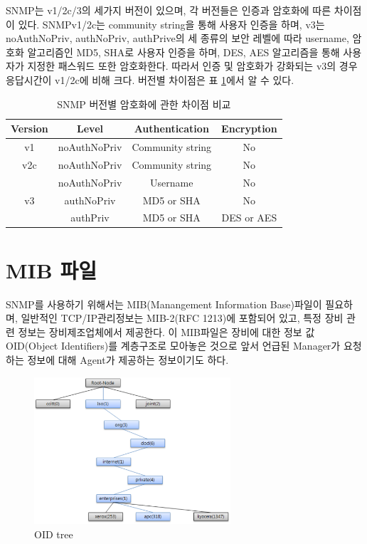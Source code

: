 \documentclass[11pt
  , a4paper
  , article
  , oneside
]{memoir}
\begin{document}
\hfil\break
\hfil\break
\hfil\break
\hfil\break

SNMP는 v1/2c/3의 세가지 버전이 있으며, 각 버전들은 인증과 암호화에 따른 차이점이 있다. SNMPv1/2c는 community string을 통해 사용자 인증을 하며, v3는 noAuthNoPriv, authNoPriv, authPrive의 세 종류의 보안 레벨에 따라 username, 암호화 알고리즘인 MD5, SHA로 사용자 인증을 하며, DES, AES 알고리즘을 통해 사용자가 지정한 패스워드 또한 암호화한다. 따라서 인증 및 암호화가 강화되는 v3의 경우 응답시간이 v1/2c에 비해 크다. 버전별 차이점은 표 \ref{table:conparision}\citep{comparison}에서 알 수 있다.

\begin{table}[h!]
\begin{center}
\begin{tabular}{c|c|c|c}\hline
Version & Level & Authentication & Encryption \\ \hline
v1 & noAuthNoPriv & Community string & No \\ \hline
v2c & noAuthNoPriv & Community string & No \\ \hline
 & noAuthNoPriv & Username & No \\ \cline{2-4}
v3 & authNoPriv & MD5 or SHA & No \\ \cline{2-4}
 & authPriv & MD5 or SHA & DES or AES \\ \hline
\end{tabular}
\caption{SNMP 버전별 암호화에 관한 차이점 비교}
  \label{table:conparision}  
\end{center}
\end{table} 

\section{MIB 파일}
SNMP를 사용하기 위해서는 MIB(Manangement Information Base)파일이 필요하며, 일반적인 TCP/IP관리정보는 MIB-2(RFC 1213)에 포함되어 있고, 특정 장비 관련 정보는 장비제조업체에서 제공한다. 이 MIB파일은 장비에 대한 정보 값 OID(Object Identifiers)를 계층구조로 모아놓은 것으로 앞서 언급된 Manager가 요청하는 정보에 대해 Agent가 제공하는 정보이기도 하다. 

\begin{figure}[h!]
  \centering
  \includegraphics[width=0.65\textwidth]{./images/oid_tree.eps}
  \caption{OID tree}
  \label{fig:oid_tree} 
\end{figure}
\end{document}
